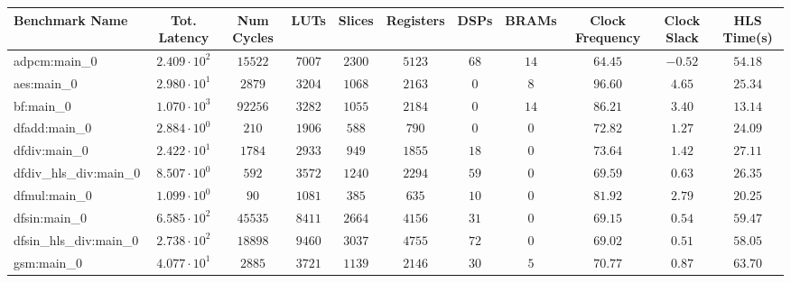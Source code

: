 \begin{tabular}{|l|c|c|c|c|c|c|c|c|c|c|}
\hline
Benchmark Name          & Tot. Latency           & Num Cycles & LUTs      & Slices    & Registers & DSPs    & BRAMs   & Clock Frequency & Clock Slack & HLS Time(s) \\
\hline
adpcm:main\_0           & $ 2.409 \cdot 10^{2} $ & $ 15522  $ & $ 7007  $ & $ 2300  $ & $ 5123  $ & $ 68  $ & $ 14  $ & $ 64.45       $ & $ -0.52   $ & $ 54.18   $ \\
aes:main\_0             & $ 2.980 \cdot 10^{1} $ & $ 2879   $ & $ 3204  $ & $ 1068  $ & $ 2163  $ & $ 0   $ & $ 8   $ & $ 96.60       $ & $ 4.65    $ & $ 25.34   $ \\
bf:main\_0              & $ 1.070 \cdot 10^{3} $ & $ 92256  $ & $ 3282  $ & $ 1055  $ & $ 2184  $ & $ 0   $ & $ 14  $ & $ 86.21       $ & $ 3.40    $ & $ 13.14   $ \\
dfadd:main\_0           & $ 2.884 \cdot 10^{0} $ & $ 210    $ & $ 1906  $ & $ 588   $ & $ 790   $ & $ 0   $ & $ 0   $ & $ 72.82       $ & $ 1.27    $ & $ 24.09   $ \\
dfdiv:main\_0           & $ 2.422 \cdot 10^{1} $ & $ 1784   $ & $ 2933  $ & $ 949   $ & $ 1855  $ & $ 18  $ & $ 0   $ & $ 73.64       $ & $ 1.42    $ & $ 27.11   $ \\
dfdiv\_hls\_div:main\_0 & $ 8.507 \cdot 10^{0} $ & $ 592    $ & $ 3572  $ & $ 1240  $ & $ 2294  $ & $ 59  $ & $ 0   $ & $ 69.59       $ & $ 0.63    $ & $ 26.35   $ \\
dfmul:main\_0           & $ 1.099 \cdot 10^{0} $ & $ 90     $ & $ 1081  $ & $ 385   $ & $ 635   $ & $ 10  $ & $ 0   $ & $ 81.92       $ & $ 2.79    $ & $ 20.25   $ \\
dfsin:main\_0           & $ 6.585 \cdot 10^{2} $ & $ 45535  $ & $ 8411  $ & $ 2664  $ & $ 4156  $ & $ 31  $ & $ 0   $ & $ 69.15       $ & $ 0.54    $ & $ 59.47   $ \\
dfsin\_hls\_div:main\_0 & $ 2.738 \cdot 10^{2} $ & $ 18898  $ & $ 9460  $ & $ 3037  $ & $ 4755  $ & $ 72  $ & $ 0   $ & $ 69.02       $ & $ 0.51    $ & $ 58.05   $ \\
gsm:main\_0             & $ 4.077 \cdot 10^{1} $ & $ 2885   $ & $ 3721  $ & $ 1139  $ & $ 2146  $ & $ 30  $ & $ 5   $ & $ 70.77       $ & $ 0.87    $ & $ 63.70   $ \\

\end{tabular}
